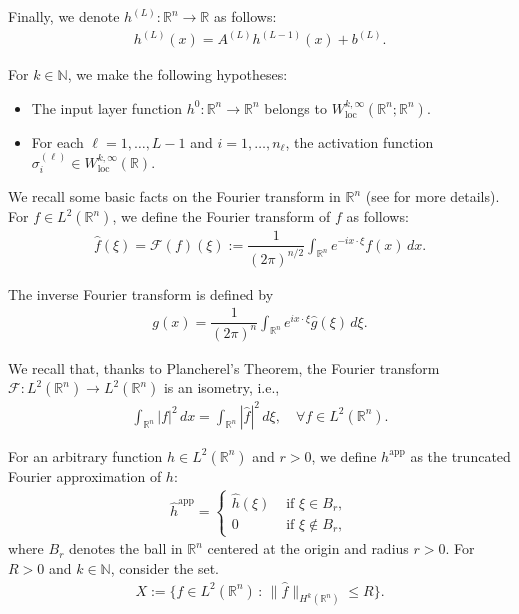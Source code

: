\documentclass[letterpaper,11pt]{article}
\numberwithin{equation}{section}
\renewcommand{\leq}{\leqslant}
\numberwithin{equation}{section}
\begin{document}
    Finally, we denote $h^{(L)}:\mathbb{R}^{n} \to \mathbb{R}$ as follows:
    \begin{align}
        \label{def:h:L}
        h^{(L)}(x)=A^{(L)} h^{(L-1)}(x) + b^{(L)}.
    \end{align}

For $k\in \mathbb{N}$, we make the following hypotheses:
\begin{itemize}
    \item[{\bf (A1)}] The input layer function $h^0:\mathbb{R}^n \to \mathbb{R}^n$ belongs to $W^{k,\infty}_{\text{loc}}(\mathbb{R}^n;\mathbb{R}^n)$. 

    \item[{\bf (A2)}] For each $\ell=1,\ldots,L-1$ and $i=1,\ldots,n_\ell$, the activation function $\sigma_i^{(\ell)}\in W^{k,\infty}_{\text{loc}}(\mathbb{R})$.
\end{itemize}

We recall some basic facts on the Fourier transform in $\mathbb{R}^n$ (see \cite{dautrayvol2} for more details). For $f\in L^2(\mathbb{R}^n)$, we define the Fourier transform of $f$ as follows:
\begin{align*}
    \hat{f}(\xi)=\mathcal{F}(f)(\xi):=\dfrac{1}{(2\pi)^{n/2}} \int_{\mathbb{R}^n} e^{-ix\cdot \xi} f(x)\,dx.
\end{align*}

The inverse Fourier transform is defined by 
\begin{align*}
    g(x)=\dfrac{1}{(2\pi)^{n}} \int_{\mathbb{R}^n} e^{ix\cdot \xi} \hat{g}(\xi)\,d\xi.
\end{align*}

We recall that, thanks to Plancherel's Theorem, the Fourier transform $\mathcal{F}:L^2(\mathbb{R}^n) \to L^2(\mathbb{R}^n)$ is an isometry, i.e., 
\begin{align*}
    \int_{\mathbb{R}^n} |f|^2\,dx =\int_{\mathbb{R}^n} |\hat{f}|^2\,d\xi,\quad \forall f\in L^2(\mathbb{R}^n).
\end{align*}

For an arbitrary function $h\in L^2(\mathbb{R}^n)$ and $r>0$, we define $h^{\text{app}}$ as the truncated Fourier approximation of $h$:
\begin{align}
    \label{def:h:app}
    \hat{h}^{\text{app}}=\begin{cases}
        \hat{h}(\xi)&\text{ if }\xi \in B_r,\\
        0&\text{ if }\xi \notin B_r,
    \end{cases}
\end{align}
where $B_r$ denotes the ball in $\mathbb{R}^n$ centered at the origin and radius $r>0$. For $R>0$ and $k\in \mathbb{N}$, consider the set.
\begin{align*}
    X:=\{f\in L^2(\mathbb{R}^n)\,:\, \|\hat{f}\|_{H^k(\mathbb{R}^n)} \leq R \}.
\end{align*}
\end{document}
